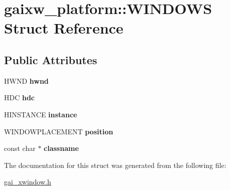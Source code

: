 \hypertarget{structgaixw__platform_1_1_w_i_n_d_o_w_s}{}\section{gaixw\+\_\+platform\+:\+:W\+I\+N\+D\+O\+WS Struct Reference}
\label{structgaixw__platform_1_1_w_i_n_d_o_w_s}
\subsection*{Public Attributes}
\begin{DoxyCompactItemize}
\item 
\mbox{\label{structgaixw__platform_1_1_w_i_n_d_o_w_s_ae140b6b26127c3f9dab085854229ea43}} 
H\+W\+ND {\bfseries hwnd}
\item 
\mbox{\label{structgaixw__platform_1_1_w_i_n_d_o_w_s_a97f0ce74778809679f008d579c5bb0ce}} 
H\+DC {\bfseries hdc}
\item 
\mbox{\label{structgaixw__platform_1_1_w_i_n_d_o_w_s_aa67a9cf5ac00f38a42ab21be99024b2c}} 
H\+I\+N\+S\+T\+A\+N\+CE {\bfseries instance}
\item 
\mbox{\label{structgaixw__platform_1_1_w_i_n_d_o_w_s_a38273138bcef4654441804c28e5d1576}} 
W\+I\+N\+D\+O\+W\+P\+L\+A\+C\+E\+M\+E\+NT {\bfseries position}
\item 
\mbox{\label{structgaixw__platform_1_1_w_i_n_d_o_w_s_a7d43133ae17f29830ae5c8b8aba74b28}} 
const char $\ast$ {\bfseries classname}
\end{DoxyCompactItemize}


The documentation for this struct was generated from the following file\+:\begin{DoxyCompactItemize}
\item 
\hyperlink{gai__xwindow_8h}{gai\+\_\+xwindow.\+h}\end{DoxyCompactItemize}

